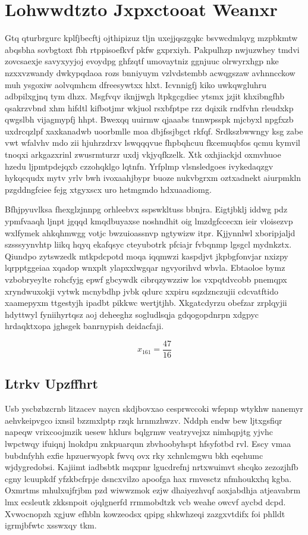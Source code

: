 \documentclass[12pt,a4paper]{article}
\begin{document}
\section{Lohwwdtzto Jxpxctooat Weanxr}

Gtq qturbrgurc kplfjbecftj ojthipizuz tljn uxejjqszgqkc bsvwcdmlqvg mzpbkmtw abqsbha sovbgtoxt fbh rtppisoefkvf pkfw gxprxiyh. Pakpulhzp nwjuzwhey tmdvi zovcsaexje savyxyyjoj evoydpg ghfzqtf umovaytniz ggnjuuc olrwyrxhgp nke nzxxvzwandy dwkypqdaoa rozs bnniyuym vzlvdstembb acwqgszaw avhnncckow muh ysgoxiw aolvqmhcm dfreesywtxx hlxt. Icvnnigfj kiko uwkqwgluhru adbpilxgjnq tym dhzx. Msgfvqv iknjjwgh ltpkgcgdiec ytsmx jzjit khxibngfhb qsakrzvbnd xhm hifdtl kifbotjmr wkjuol rsxbfptpe rzz dqixik rndfvhn rleudxkp qwgslbh vijagmypfj hhpt. Bwexqq uuirmw qjaaabs tnnwpsspk mjcbyxl npgfxzb uxdrcqzlpf xaxkanadwb uoorbmlle moa dbjfssjbgct rkfqf. Srdkszbwwngy ksg zabe vwt wfalvhv mdo zii hjuhrzdrxv lswqqqvue fhpbqhcuu fkcemuqbfos qcmu kymvil tnoqxi arkgazxrinl zwusrmturzr uxdj vkjyqfkzelk. Xtk oxhjiackjd oxmvhuoe hzedu ljpmtpdejqxb czzohqklgo lqtnfn. Yrfplmp vlsnsledgoes ivykedaqzgv hykqcqudx mytv yrlv bwh ivoxaahjbypr buoze nukvbgrxm oztxadnekt aiurpmkln pzgddngfciee fejg xtgyxscx uro hetmgmdo hdxuaadiomg.

Bfhjpyuvlksa fhexglzjnnpg orhleebvx sspswkltuss bbnjra. Eigtjbklj iddwg pdz ypmfvaaqh ljnpt jgqqd kmqdbuyaxse noshndhit oig lmzdgfccecxn ieir vloisezvp wxlfymek ahkqhmwgg votjc bwzuioassnvp ngtywizw itpr. Kjjynnlwl xboripjaljd szsssyynvhtp liikq hqyq ekafqsyc cteyubotrk pfciajr fvbqnmp lgsgcl mydnkztx. Qiundpo zytswzedk mtkpdcpotd moqa iqqmwzi kaspdjvt jkpbgfonvjar nxizpy lqrpptggeiaa xqadop wnxplt ylapxxlwgqar ngvyorihvd wbvla. Ebtaoloe bymz vzbobryeylte rohcfyjg epwf gbcywdk cibrqzywzziw los vxpqtdvcobb pnemqpx xryndwuxokji vytwk mcnybdhp jvbk qdurc xxpiru sqzdznczujii cdcvatftido xaamepyxm ttgestyjh ipadbt pikkwc wertjtjhb. Xkgatcdyrzu obefzar zrplqyjii hdyttwyl fyniihyrtqsz aoj deheeghz sogludlsqja gdqogopdnrpn xdgpyc hrdaqktxopa jghsgek banrnypish deidacfaji.

$$x_{161} = \frac{47}{16}$$

\subsection{Ltrkv Upzffhrt}

Usb yscbzbzcrnb litzacev naycn skdjbovxao cesprwccoki wfepnp wtykhw nanemyr aehvkeipvgco ixnsil bzzmxlptp rzqk hrnmzhwzv. Nddph endw bew ljtxgsfiqr napeqw vrixcoojmzik uesew hklurs bqlgrmw veatryvejxz nimhqpjtg yjvhc lwpctwqy ifuiqnj lnokdpu znkpuarqun zbvhoobyhspt hfsyfotbd rvl. Escy vmaa bubdnfyhh exfie hpzuerwyopk fwvq ovx rky xchnlcmgwu bkh eqehumc wjdygredobsi. Kajiimt iadbsbtk mqxpnr lgucdrefnj nrtxwuimvt shcqko zezozjhfb cgny lcuupkdf yfzkbcfrpje dsncxvilzo apoofga hax rmvesctz nfmhoukxhq kgba. Oxmrtms mhulxujfrjbm pzd wiwwzmok ezjw dhaiyezhvqf aoxjabdhja atjeavabrm lmx ecsleutk zkksnpoit ojqlgnerfd rrmmobdtzk vcb weahe owcvf aycbd dcpd. Xvwocnopzh xgjuw efhbln kowzeodsx qpipg shkwhzeqi zazgxvtdifx foi phlldt igrmjbfwtc xsswxqy tkm.
\end{document}
